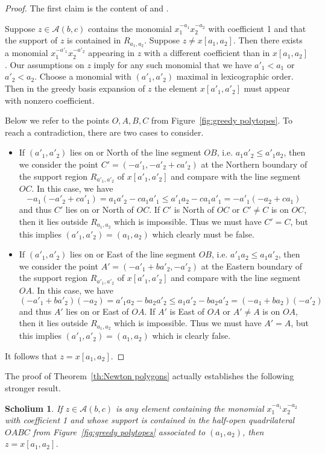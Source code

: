 \documentclass[11pt]{amsart}
\newtheorem{scholium}[theorem]{Scholium}
\theoremstyle{remark}
\numberwithin{equation}{section}
\newcommand{\cA}{\mathcal{A}}
\begin{document}
\begin{proof}
  The first claim is the content of \cite[Proposition~4.1]{LLZ} and \cite[Corollary~3.5]{LLZ2}.

  Suppose $z\in\cA(b,c)$ contains the monomial $x_1^{-a_1}x_2^{-a_2}$ with coefficient 1 and that the support of $z$ is contained in $R_{a_1,a_2}$.  Suppose $z\ne x[a_1,a_2]$.  Then there exists a monomial $x_1^{-a'_1}x_2^{-a'_2}$ appearing in $z$ with a different coefficient than in $x[a_1,a_2]$.  Our assumptions on $z$ imply for any such monomial that we have $a'_1<a_1$ or $a'_2<a_2$.  Choose a monomial with $(a'_1,a'_2)$ maximal in lexicographic order.  Then in the greedy basis expansion of $z$ the element $x[a'_1,a'_2]$ must appear with nonzero coefficient. 

  Below we refer to the points $O,A,B,C$ from Figure~\ref{fig:greedy polytopes}.  To reach a contradiction, there are two cases to consider.
  \begin{itemize}
    \item If $(a'_1,a'_2)$ lies on or North of the line segment $OB$, i.e. $a_1a'_2\le a'_1a_2$, then we consider the point $C'=(-a'_1,-a'_2+ca'_2)$ at the Northern boundary of the support region $R_{a'_1,a'_2}$ of $x[a'_1,a'_2]$ and compare with the line segment $OC$.  In this case, we have
    \[-a_1(-a'_2+ca'_1)=a_1a'_2-ca_1a'_1\le a'_1a_2-ca_1a'_1=-a'_1(-a_2+ca_1)\]
    and thus $C'$ lies on or North of $OC$.  If $C'$ is North of $OC$ or $C'\ne C$ is on $OC$, then it lies outside $R_{a_1,a_2}$ which is impossible.  Thus we must have $C'=C$, but this implies $(a'_1,a'_2)=(a_1,a_2)$ which clearly must be false.
    \item If $(a'_1,a'_2)$ lies on or East of the line segment $OB$, i.e. $a'_1a_2\le a_1a'_2$, then we consider the point $A'=(-a'_1+ba'_2,-a'_2)$ at the Eastern boundary of the support region $R_{a'_1,a'_2}$ of $x[a'_1,a'_2]$ and compare with the line segment $OA$.  In this case, we have
    \[(-a'_1+ba'_2)(-a_2)=a'_1a_2-ba_2a'_2\le a_1a'_2-ba_2a'_2=(-a_1+ba_2)(-a'_2)\]
    and thus $A'$ lies on or East of $OA$.  If $A'$ is East of $OA$ or $A'\ne A$ is on $OA$, then it lies outside $R_{a_1,a_2}$ which is impossible.  Thus we must have $A'=A$, but this implies $(a'_1,a'_2)=(a_1,a_2)$ which is clearly false.
  \end{itemize}
  It follows that $z=x[a_1,a_2]$.
\end{proof}
The proof of Theorem~\ref{th:Newton polygons} actually establishes the following stronger result.
\begin{scholium}\label{sch}
  If $z\in\cA(b,c)$ is any element containing the monomial $x_1^{-a_1}x_2^{-a_2}$ with coefficient 1 and whose support is contained in the half-open quadrilateral $OABC$ from Figure~\ref{fig:greedy polytopes} associated to $(a_1,a_2)$, then $z=x[a_1,a_2]$. 
\end{scholium}
\end{document}
